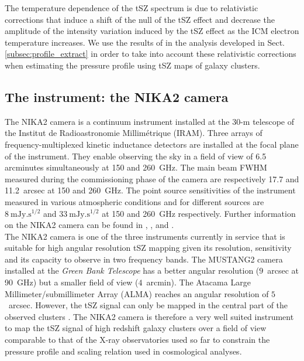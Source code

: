 \documentclass[twocolumn,traditabstract]{aa}
\begin{document}
The temperature dependence of the tSZ spectrum is due to relativistic corrections that induce a shift of the null of the tSZ effect and decrease the amplitude of the intensity variation induced by the tSZ effect as the ICM electron temperature increases. We use the results of \cite{ito98,poi98} in the analysis developed in Sect. \ref{subsec:profile_extract} in order to take into account these relativistic corrections when estimating the pressure profile using tSZ maps of galaxy clusters. 

\subsection{The instrument: the NIKA2 camera}\label{subsec:nika2_cam}

The NIKA2 camera is a continuum instrument installed at the 30-m telescope of the Institut de Radioastronomie Millimétrique (IRAM). Three arrays of frequency-multiplexed kinetic inductance detectors \citep[KIDs;][]{mon10,roe12} are installed at the focal plane of the instrument. They enable observing the sky in a field of view of 6.5 arcminutes simultaneously at 150 and 260~GHz. The main beam FWHM measured during the commissioning phase of the camera are respectively 17.7 and 11.2~arcsec at 150 and 260~GHz. The point source sensitivities of the instrument measured in various atmospheric conditions and for different sources are $8~\mathrm{mJy.s^{1/2}}$ and $33~\mathrm{mJy.s^{1/2}}$ at 150 and 260~GHz respectively. Further information on the NIKA2 camera can be found in \cite{ada18}, \cite{cal16}, and \cite{bou16}.\\

The NIKA2 camera is one of the three instruments currently in service that is suitable for high angular resolution tSZ mapping given its resolution, sensitivity and its capacity to observe in two frequency bands. The MUSTANG2 \citep{dic14} camera installed at the \emph{Green Bank Telescope} has a better angular resolution ($9$~arcsec at 90~GHz) but a smaller field of view ($4$~arcmin). The Atacama Large Millimeter/submillimeter Array (ALMA) reaches an angular resolution of $5$~arcsec. However, the tSZ signal can only be mapped in the central part of the observed clusters \citep{kit16}. The NIKA2 camera is therefore a very well suited instrument to map the tSZ signal of high redshift galaxy clusters over a field of view comparable to that of the X-ray observatories used so far to constrain the pressure profile and scaling relation used in cosmological analyses.
\end{document}
